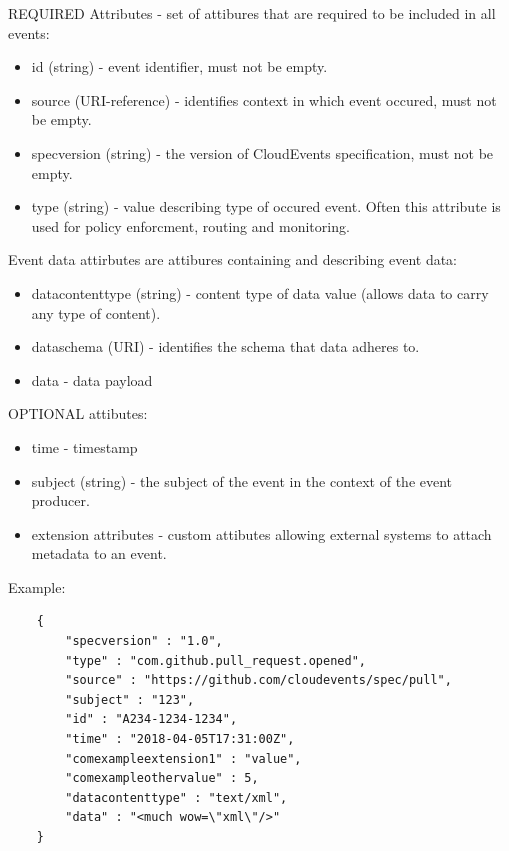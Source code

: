     REQUIRED Attributes - set of attibures that are required to be included in all events\cite{eventCloudEventsSpec}:
    \begin{itemize}
        \item id (string) - event identifier, must not be empty.
        \item source (URI-reference) - identifies context in which event occured, must not be empty.
        \item specversion (string) - the version of CloudEvents specification, must not be empty.
        \item type (string) - value describing type of occured event. Often this attribute is used for policy enforcment, routing and monitoring.
    \end{itemize}

    Event data attirbutes are attibures containing and describing event data:
    \begin{itemize}
        \item datacontenttype (string) - content type of data value (allows data to carry any type of content).
        \item dataschema (URI) - identifies the schema that data adheres to.
        \item data - data payload
    \end{itemize}

    OPTIONAL attibutes:
    \begin{itemize}
        \item time - timestamp
        \item subject (string) - the subject of the event in the context of the event producer.
        \item extension attributes - custom attibutes allowing external systems to attach metadata to an event.
    \end{itemize}

    Example:
    \begin{lstlisting}
    {
        "specversion" : "1.0",
        "type" : "com.github.pull_request.opened",
        "source" : "https://github.com/cloudevents/spec/pull",
        "subject" : "123",
        "id" : "A234-1234-1234",
        "time" : "2018-04-05T17:31:00Z",
        "comexampleextension1" : "value",
        "comexampleothervalue" : 5,
        "datacontenttype" : "text/xml",
        "data" : "<much wow=\"xml\"/>"
    }
    \end{lstlisting}

